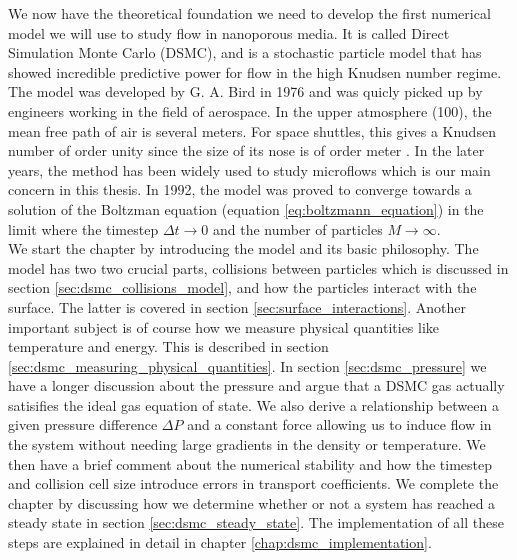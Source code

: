 We now have the theoretical foundation we need to develop the first numerical model we will use to study flow in nanoporous media. It is called Direct Simulation Monte Carlo (DSMC), and is a stochastic particle model that has showed incredible predictive power for flow in the high Knudsen number regime. The model was developed by G. A. Bird in 1976 and was quicly picked up by engineers working in the field of aerospace. In the upper atmosphere (\unit{100}{\kilo\meter}), the mean free path of air is several meters. For space shuttles, this gives a Knudsen number of order unity since the size of its nose is of order meter \cite{alexander1997direct}. In the later years, the method has been widely used to study microflows which is our main concern in this thesis. In 1992, the model was proved to converge towards a solution of the Boltzman equation (equation \eqref{eq:boltzmann_equation}) in the limit where the timestep $\Delta t\rightarrow 0$ and the number of particles $M\rightarrow \infty$.\\
We start the chapter by introducing the model and its basic philosophy. The model has two two crucial parts, collisions between particles which is discussed in section \ref{sec:dsmc_collisions_model}, and how the particles interact with the surface. The latter is covered in section \ref{sec:surface_interactions}. Another important subject is of course how we measure physical quantities like temperature and energy. This is described in section \ref{sec:dsmc_measuring_physical_quantities}. In section \ref{sec:dsmc_pressure} we have a longer discussion about the pressure and argue that a DSMC gas actually satisifies the ideal gas equation of state. We also derive a relationship between a given pressure difference $\Delta P$ and a constant force allowing us to induce flow in the system without needing large gradients in the density or temperature. We then have a brief comment about the numerical stability and how the timestep and collision cell size introduce errors in transport coefficients. We complete the chapter by discussing how we determine whether or not a system has reached a steady state in section \ref{sec:dsmc_steady_state}. The implementation of all these steps are explained in detail in chapter \ref{chap:dsmc_implementation}.